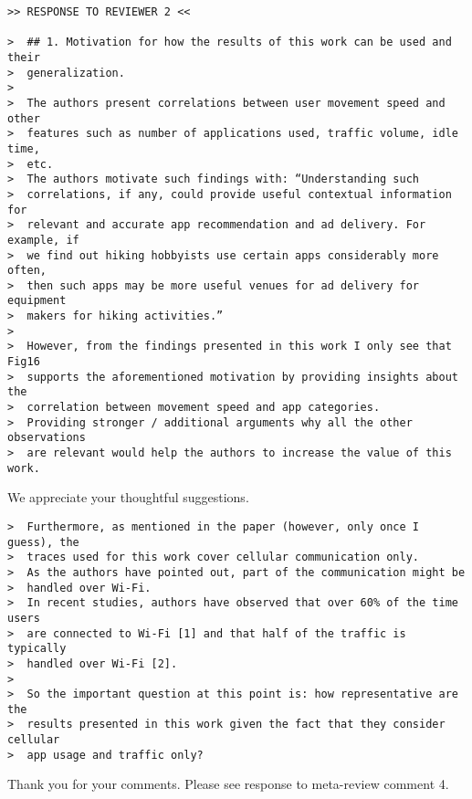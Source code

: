 \newpage
\begin{verbatim}
>> RESPONSE TO REVIEWER 2 <<
 
>  ## 1. Motivation for how the results of this work can be used and their
>  generalization.
>
>  The authors present correlations between user movement speed and other
>  features such as number of applications used, traffic volume, idle time,
>  etc.
>  The authors motivate such findings with: “Understanding such
>  correlations, if any, could provide useful contextual information for
>  relevant and accurate app recommendation and ad delivery. For example, if
>  we find out hiking hobbyists use certain apps considerably more often,
>  then such apps may be more useful venues for ad delivery for equipment
>  makers for hiking activities.”
>
>  However, from the findings presented in this work I only see that Fig16
>  supports the aforementioned motivation by providing insights about the
>  correlation between movement speed and app categories.
>  Providing stronger / additional arguments why all the other observations
>  are relevant would help the authors to increase the value of this work.
\end{verbatim}

We appreciate your thoughtful suggestions. 


\begin{verbatim}
>  Furthermore, as mentioned in the paper (however, only once I guess), the
>  traces used for this work cover cellular communication only.
>  As the authors have pointed out, part of the communication might be
>  handled over Wi-Fi.
>  In recent studies, authors have observed that over 60% of the time users
>  are connected to Wi-Fi [1] and that half of the traffic is typically
>  handled over Wi-Fi [2].
>
>  So the important question at this point is: how representative are the
>  results presented in this work given the fact that they consider cellular
>  app usage and traffic only?
\end{verbatim}

Thank you for your comments. 
Please see response to meta-review comment 4.

